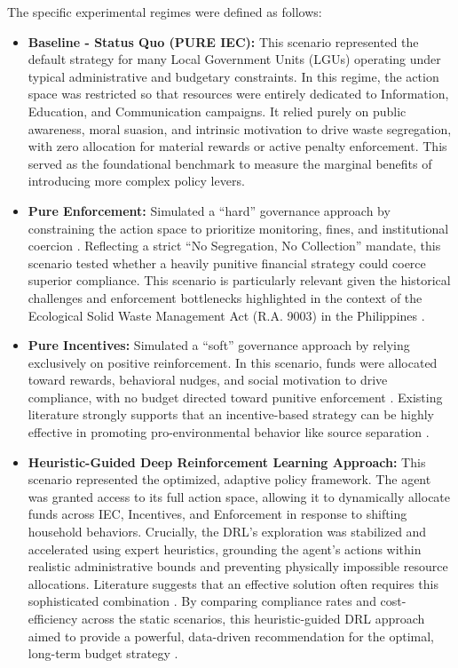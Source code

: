 The specific experimental regimes were defined as follows:

\begin{itemize}
    \item \textbf{Baseline - Status Quo (PURE IEC):} This scenario represented the default strategy for many Local Government Units (LGUs) operating under typical administrative and budgetary constraints. In this regime, the action space was restricted so that resources were entirely dedicated to Information, Education, and Communication campaigns. It relied purely on public awareness, moral suasion, and intrinsic motivation to drive waste segregation, with zero allocation for material rewards or active penalty enforcement. This served as the foundational benchmark to measure the marginal benefits of introducing more complex policy levers.
    
    \item \textbf{Pure Enforcement:} Simulated a ``hard'' governance approach by constraining the action space to prioritize monitoring, fines, and institutional coercion \citep{Wang2023}. Reflecting a strict ``No Segregation, No Collection'' mandate, this scenario tested whether a heavily punitive financial strategy could coerce superior compliance. This scenario is particularly relevant given the historical challenges and enforcement bottlenecks highlighted in the context of the Ecological Solid Waste Management Act (R.A. 9003) in the Philippines \citep{Dalugdog2021}.
    
    \item \textbf{Pure Incentives:} Simulated a ``soft'' governance approach by relying exclusively on positive reinforcement. In this scenario, funds were allocated toward rewards, behavioral nudges, and social motivation to drive compliance, with no budget directed toward punitive enforcement \citep{LoanBalanay2023}. Existing literature strongly supports that an incentive-based strategy can be highly effective in promoting pro-environmental behavior like source separation \citep{Chen2023, MuZhang2021, Vorobeva2022}.
    
    \item \textbf{Heuristic-Guided Deep Reinforcement Learning Approach:} This scenario represented the optimized, adaptive policy framework. The agent was granted access to its full action space, allowing it to dynamically allocate funds across IEC, Incentives, and Enforcement in response to shifting household behaviors. Crucially, the DRL's exploration was stabilized and accelerated using expert heuristics, grounding the agent's actions within realistic administrative bounds and preventing physically impossible resource allocations. Literature suggests that an effective solution often requires this sophisticated combination \citep{MuZhang2021, Zhao2022}. By comparing compliance rates and cost-efficiency across the static scenarios, this heuristic-guided DRL approach aimed to provide a powerful, data-driven recommendation for the optimal, long-term budget strategy \citep{TianReview2024}.
\end{itemize}

